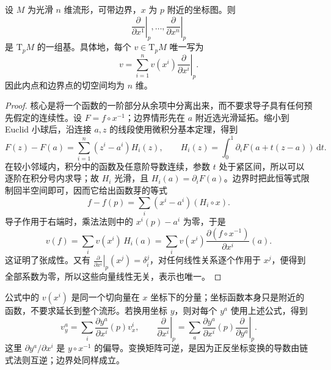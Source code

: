 \begin{proposition}
	\label{g1:prop:derivation-coordinate-basis}
	设 \(M\) 为光滑 \(n\) 维流形，可带边界，\(x\) 为 \(p\) 附近的坐标图。则
	\[
		\left.\frac{\partial}{\partial x^1}\right|_p,\ldots,
		\left.\frac{\partial}{\partial x^n}\right|_p
	\]
	是 \(\mathrm{T}_pM\) 的一组基。具体地，每个 \(v\in \mathrm{T}_pM\) 唯一写为
	\begin{equation}
		\label{g1:eq:tangent-coordinate-basis}
		v=\sum_{i=1}^n v(x^i)\left.\frac{\partial}{\partial x^i}\right|_p.
	\end{equation}
	因此内点和边界点的切空间均为 \(n\) 维。
\end{proposition}
\begin{proof}
	核心是将一个函数的一阶部分从余项中分离出来，而不要求导子具有任何预先假定的连续性。设 \(F=f\circ x^{-1}\)；边界情形先在 \(a\) 附近选光滑延拓。缩小到 Euclid 小球后，沿连接 \(a,z\) 的线段使用微积分基本定理，得到
	\[
		F(z)-F(a)=\sum_{i=1}^n(z^i-a^i)H_i(z),\qquad
		H_i(z)=\int_0^1\partial_iF(a+t(z-a))\,\mathrm{d}t.
	\]
	在较小邻域内，积分中的函数及任意阶导数连续，参数 \(t\) 处于紧区间，所以可以逐阶在积分号内求导；故 \(H_i\) 光滑，且 \(H_i(a)=\partial_iF(a)\)。边界时把此恒等式限制回半空间即可，因而它给出函数芽的等式
	\[
		f-f(p)=\sum_i(x^i-a^i)(H_i\circ x).
	\]
	导子作用于右端时，乘法法则中的 \(x^i(p)-a^i\) 为零，于是
	\[
		v(f)=\sum_i v(x^i)\,H_i(a)
		=\sum_i v(x^i)\frac{\partial(f\circ x^{-1})}{\partial x^i}(a).
	\]
	这证明了张成性。又有 \(\left.\frac{\partial}{\partial x^i}\right|_p(x^j)=\delta_i^j\)，对任何线性关系逐个作用于 \(x^j\)，便得到全部系数为零，所以这些向量线性无关，表示也唯一。
\end{proof}

公式中的 \(v(x^i)\) 是同一个切向量在 \(x\) 坐标下的分量；坐标函数本身只是附近的函数，不要求延长到整个流形。若换用坐标 \(y\)，则对每个 \(y^a\) 使用上述公式，得到
\begin{equation}
	\label{g1:eq:tangent-coordinate-change}
	v_y^a=\sum_i\frac{\partial y^a}{\partial x^i}(p)v_x^i,
	\qquad
	\left.\frac{\partial}{\partial x^i}\right|_p
	=\sum_a\frac{\partial y^a}{\partial x^i}(p)
	\left.\frac{\partial}{\partial y^a}\right|_p.
\end{equation}
这里 \(\partial y^a/\partial x^i\) 是 \(y\circ x^{-1}\) 的偏导。变换矩阵可逆，是因为正反坐标变换的导数由链式法则互逆；边界处同样成立。

